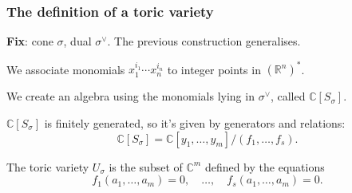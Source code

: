 \documentclass[handout]{beamer}
\theoremstyle{definition}
\theoremstyle{definition}
\begin{document}
\begin{frame}
\frametitle{The definition of a toric variety}
\textbf{Fix}: cone $\sigma$, dual $\sigma^\vee$. 
The previous construction generalises.

\pause
We associate monomials $x_1^{i_1} \cdots x_n^{i_n}$ to integer points in $(\mathbb{R}^n)^*$.

\pause
We create an algebra using the monomials lying in $\sigma^\vee$, called $\mathbb{C}[S_\sigma]$.

\pause
$\mathbb{C}[S_\sigma]$ is finitely generated, so it's given by generators and relations:
$$\mathbb{C}[S_\sigma] = \mathbb{C}[y_1, \ldots, y_m]/(f_1, \ldots, f_s).$$

\pause
The \alert{toric variety} $U_\sigma$ is the subset of $\mathbb{C}^m$ defined by the equations
$$f_1(a_1, \ldots, a_m) = 0, \quad \ldots, \quad  f_s(a_1, \ldots, a_m) = 0.$$
\end{frame}
\end{document}
